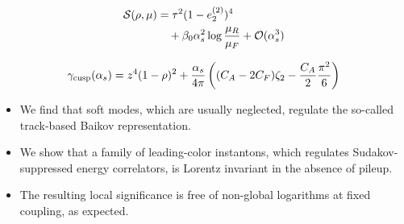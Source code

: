 \begin{align}
  \mathcal{S}(\rho, \mu) &= {\tau}^{2} (1 - e_2^{(2)})^{4} \nonumber \\
  &\quad + \beta_0 \alpha_s^2 \log\frac{\mu_R}{\mu_F} + \mathcal{O}(\alpha_s^3) \label{eq:1}
\end{align}

\begin{equation}
  \gamma_{\rm cusp}(\alpha_s) = {z}^{4} (1 - \rho)^{2} + \frac{\alpha_s}{4\pi} \left( (C_A - 2C_F) \zeta_{2} - \frac{C_A}{2} \frac{\pi^2}{6} \right)
  \label{eq:3}
\end{equation}

\begin{itemize}
  \item We find that soft modes, which are usually neglected, regulate the so-called track-based Baikov representation.
  \item We show that a family of leading-color instantons, which regulates Sudakov-suppressed energy correlators, is Lorentz invariant in the absence of pileup.
  \item The resulting local significance is free of non-global logarithms at fixed coupling, as expected.
\end{itemize}

